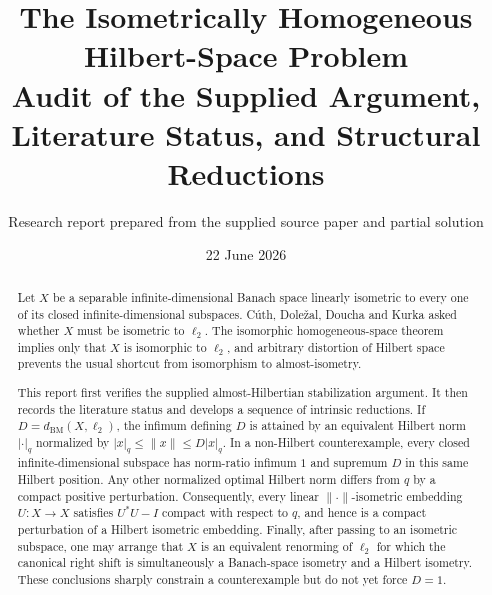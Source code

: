\documentclass[11pt]{article}
\title{\textbf{The Isometrically Homogeneous Hilbert-Space Problem}\\[0.4em]
\large Audit of the Supplied Argument, Literature Status, and Structural Reductions}
\author{Research report prepared from the supplied source paper and partial solution}
\date{22 June 2026}
\theoremstyle{definition}
\begin{document}
\maketitle

\begin{center}
\end{center}

\begin{abstract}
Let $X$ be a separable infinite-dimensional Banach space linearly isometric to
every one of its closed infinite-dimensional subspaces.  C\'uth, Dole\v{z}al,
Doucha and Kurka asked whether $X$ must be isometric to $\ell_2$.  The
isomorphic homogeneous-space theorem implies only that $X$ is isomorphic to
$\ell_2$, and arbitrary distortion of Hilbert space prevents the usual shortcut
from isomorphism to almost-isometry.

This report first verifies the supplied almost-Hilbertian stabilization
argument.  It then records the literature status and develops a sequence of
intrinsic reductions.  If $D=d_{\mathrm{BM}}(X,\ell_2)$, the infimum defining
$D$ is attained by an equivalent Hilbert norm $|\cdot|_q$ normalized by
$|x|_q\leq\|x\|\leq D|x|_q$.  In a non-Hilbert counterexample, every closed
infinite-dimensional subspace has norm-ratio infimum $1$ and supremum $D$ in
this same Hilbert position.  Any other normalized optimal Hilbert norm differs
from $q$ by a compact positive perturbation.  Consequently, every linear
$\|\cdot\|$-isometric embedding $U:X\to X$ satisfies $U^*U-I$ compact with
respect to $q$, and hence is a compact perturbation of a Hilbert isometric
embedding.  Finally, after passing to an isometric subspace, one may arrange
that $X$ is an equivalent renorming of $\ell_2$ for which the canonical right
shift is simultaneously a Banach-space isometry and a Hilbert isometry.
These conclusions sharply constrain a counterexample but do not yet force
$D=1$.
\end{abstract}
\end{document}
